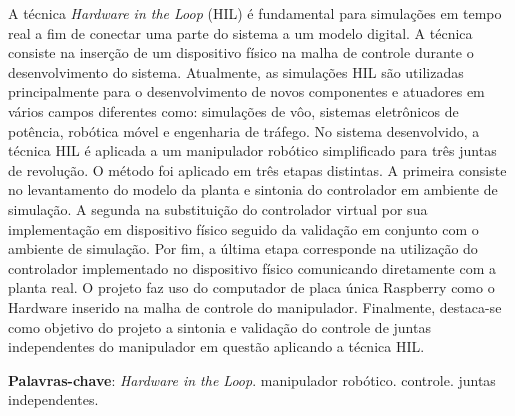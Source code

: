 \setlength{\absparsep}{18pt} %
\begin{resumo}
  A técnica \textit{Hardware in the Loop} (HIL) é fundamental para simulações em tempo real a fim de conectar uma parte 
  do sistema a um modelo digital. A técnica consiste na inserção de um dispositivo físico na malha de controle
  durante o desenvolvimento do sistema. Atualmente, as simulações HIL são utilizadas principalmente para o 
  desenvolvimento de novos componentes e atuadores em vários campos diferentes como: simulações de vôo, 
  sistemas eletrônicos de potência, robótica móvel e engenharia de tráfego. No sistema desenvolvido, a técnica 
  HIL é aplicada a um manipulador robótico simplificado para três juntas de revolução. O método foi aplicado em 
  três etapas distintas. A primeira consiste no levantamento do modelo da planta e sintonia do controlador em 
  ambiente de simulação. A segunda na substituição do controlador virtual por sua implementação em dispositivo 
  físico seguido da validação em conjunto com o ambiente de simulação. Por fim, a última etapa corresponde na 
  utilização do controlador implementado no dispositivo físico comunicando diretamente com a planta real. O projeto
  faz uso do computador de placa única Raspberry como o Hardware inserido na malha de controle do manipulador.
  Finalmente, destaca-se como objetivo do projeto a sintonia e validação do controle de juntas independentes do
  manipulador em questão aplicando a técnica HIL.
  
 \textbf{Palavras-chave}: \textit{Hardware in the Loop}. manipulador robótico. controle. juntas independentes.
\end{resumo}